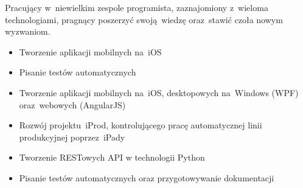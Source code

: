 \documentclass[11pt,a4paper]{article}
\begin{document}
    \bigskip

  
    \smallskip

    \noindent
    Pracujący w~niewielkim zespole programista, zaznajomiony z~wieloma technologiami, pragnący poszerzyć swoją~wiedzę oraz~stawić czoła nowym wyzwaniom.
  

    \bigskip


    \smallskip

    \vspace{-0.2cm}
    \begin{itemize} \itemsep1pt \parskip0pt 
        \item Tworzenie aplikacji mobilnych na~iOS
        \item Pisanie testów automatycznych
    \end{itemize}
    \vspace{-0.2cm}
    \vspace{-0.2cm}
    \begin{itemize} \itemsep1pt \parskip0pt 
        \item Tworzenie aplikacji mobilnych na~iOS, desktopowych na~Windows (WPF) oraz~webowych (AngularJS)
        \item Rozwój projektu~iProd, kontrolującego pracę automatycznej linii produkcyjnej poprzez~iPady
        \item Tworzenie RESTowych API w technologii Python
        \item Pisanie testów automatycznych oraz przygotowywanie dokumentacji
    \end{itemize}


    \medskip
  
  
    \smallskip
\end{document}
